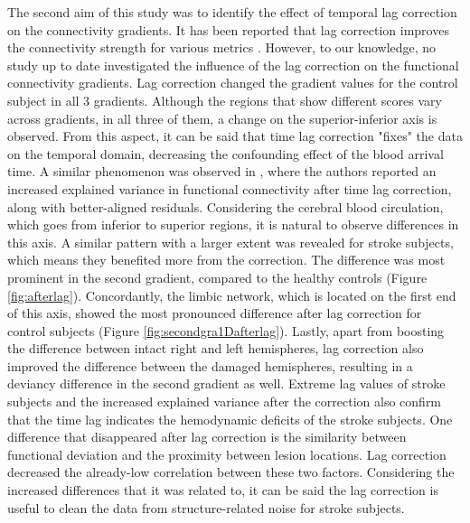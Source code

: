 \documentclass[fleqn,10pt]{wlscirep}
\begin{document}
The second aim of this study was to identify the effect of temporal lag correction on the connectivity gradients. It has been reported that lag correction improves the connectivity strength for various metrics \citep{siegel2016effects, erdougan2016correcting, tong2019low}. However, to our knowledge, no study up to date investigated the influence of the lag correction on the functional connectivity gradients. Lag correction changed the gradient values for the control subject in all 3 gradients. Although the regions that show different scores vary across gradients, in all three of them, a change on the superior-inferior axis 
is observed. From this aspect, it can be said that time lag correction "fixes" the data on the temporal domain, decreasing the confounding effect of the blood arrival time. A similar phenomenon was observed in \citet{erdougan2016correcting}, where the authors reported an increased explained variance in functional connectivity after time lag correction, along with better-aligned residuals. Considering the cerebral blood circulation, which goes from inferior to superior regions, it is natural to observe differences in this axis. A similar pattern with a larger extent was revealed for stroke subjects, which means they benefited more from the correction. The difference was most prominent in the second gradient, compared to the healthy controls (Figure \ref{fig:afterlag}). Concordantly, the limbic network, which is located on the first end of this axis, showed the most pronounced difference after lag correction for control subjects (Figure \ref{fig:secondgra1Dafterlag}). Lastly, apart from boosting the difference between intact right and left hemispheres, lag correction also improved the difference between the damaged hemispheres, resulting in a deviancy difference in the second gradient as well. Extreme lag values of stroke subjects and the increased explained variance after the correction also confirm that the time lag indicates the hemodynamic deficits of the stroke subjects. One difference that disappeared after lag correction is the similarity between functional deviation and the proximity between lesion locations. Lag correction decreased the already-low correlation between these two factors. Considering the increased differences that it was related to, it can be said the lag correction is useful to clean the data from structure-related noise for stroke subjects.
\end{document}
